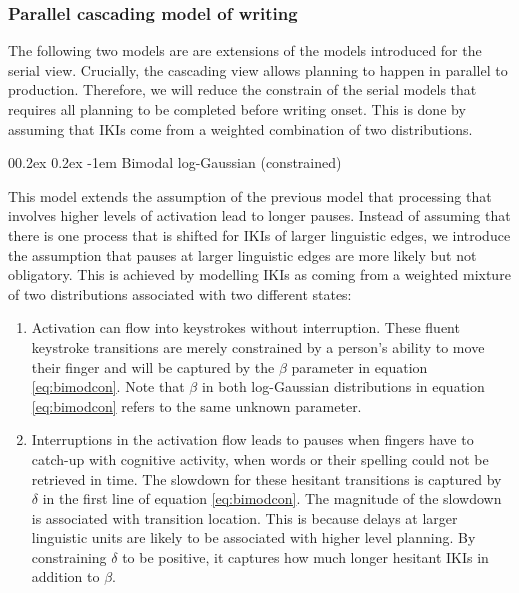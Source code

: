 \documentclass[
  english,
  man,floatsintext]{apa7}
\makeatletter
\let\oldparagraph\paragraph
\renewcommand{\paragraph}[1]{\oldparagraph{#1}\mbox{}}
\renewcommand{\paragraph}{\@startsection{paragraph}{4}{\parindent}%
  {0\baselineskip \@plus 0.2ex \@minus 0.2ex}%
  {-1em}%
  {\normalfont\normalsize\bfseries\itshape\typesectitle}}
\makeatother
\begin{document}
\hypertarget{parallel-cascading-model-of-writing}{%
\subsubsection{Parallel cascading model of writing}\label{parallel-cascading-model-of-writing}}

The following two models are are extensions of the models introduced for the serial view. Crucially, the cascading view allows planning to happen in parallel to production. Therefore, we will reduce the constrain of the serial models that requires all planning to be completed before writing onset. This is done by assuming that IKIs come from a weighted combination of two distributions.

\hypertarget{bimodal-log-gaussian-constrained}{%
\paragraph{Bimodal log-Gaussian (constrained)}\label{bimodal-log-gaussian-constrained}}

This model extends the assumption of the previous model that processing that involves higher levels of activation lead to longer pauses. Instead of assuming that there is one process that is shifted for IKIs of larger linguistic edges, we introduce the assumption that pauses at larger linguistic edges are more likely but not obligatory. This is achieved by modelling IKIs as coming from a weighted mixture of two distributions associated with two different states:

\begin{enumerate}
\def\labelenumi{\arabic{enumi}.}
\item
  Activation can flow into keystrokes without interruption. These fluent keystroke transitions are merely constrained by a person's ability to move their finger and will be captured by the \(\beta\) parameter in equation \ref{eq:bimodcon}. Note that \(\beta\) in both log-Gaussian distributions in equation \ref{eq:bimodcon} refers to the same unknown parameter.
\item
  Interruptions in the activation flow leads to pauses when fingers have to catch-up with cognitive activity, when words or their spelling could not be retrieved in time. The slowdown for these hesitant transitions is captured by \(\delta\) in the first line of equation \ref{eq:bimodcon}. The magnitude of the slowdown is associated with transition location. This is because delays at larger linguistic units are likely to be associated with higher level planning. By constraining \(\delta\) to be positive, it captures how much longer hesitant IKIs in addition to \(\beta\).
\end{enumerate}
\end{document}
